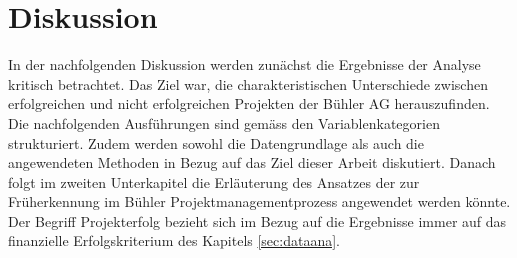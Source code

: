 \chapter{Diskussion}\label{sec:disk}
In der nachfolgenden Diskussion werden zunächst die Ergebnisse der Analyse kritisch betrachtet. Das Ziel war, die charakteristischen Unterschiede zwischen erfolgreichen und nicht erfolgreichen Projekten der Bühler AG herauszufinden. Die nachfolgenden Ausführungen sind gemäss den Variablenkategorien strukturiert. Zudem werden sowohl die Datengrundlage als auch die angewendeten Methoden in Bezug auf das Ziel dieser Arbeit diskutiert. Danach folgt im zweiten Unterkapitel die Erläuterung des Ansatzes der zur Früherkennung im Bühler Projektmanagementprozess angewendet werden könnte. Der Begriff Projekterfolg bezieht sich im Bezug auf die Ergebnisse immer auf das finanzielle Erfolgskriterium des Kapitels \ref{sec:dataana}.
\newline
